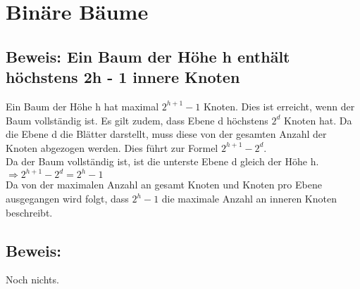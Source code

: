 \section{Binäre Bäume}
\subsection{Beweis: Ein Baum der Höhe h enthält höchstens 2h - 1 innere Knoten}
Ein Baum der Höhe h hat maximal $2^{h+1}-1$ Knoten. Dies ist erreicht, wenn der Baum vollständig ist. Es gilt zudem, dass Ebene d höchstens $2^d$ Knoten hat. Da die Ebene d die Blätter darstellt, muss diese von der gesamten Anzahl der Knoten abgezogen werden. Dies führt zur Formel $2^{h+1}-2^d$.\\Da der Baum vollständig ist, ist die unterste Ebene d gleich der Höhe h.\\
$\Rightarrow 2^{h+1}-2^d=2^{h}-1$\\
Da von der maximalen Anzahl an gesamt Knoten und Knoten pro Ebene ausgegangen wird folgt, dass $2^{h}-1$ die maximale Anzahl an inneren Knoten beschreibt.
\subsection{Beweis: }
Noch nichts.
